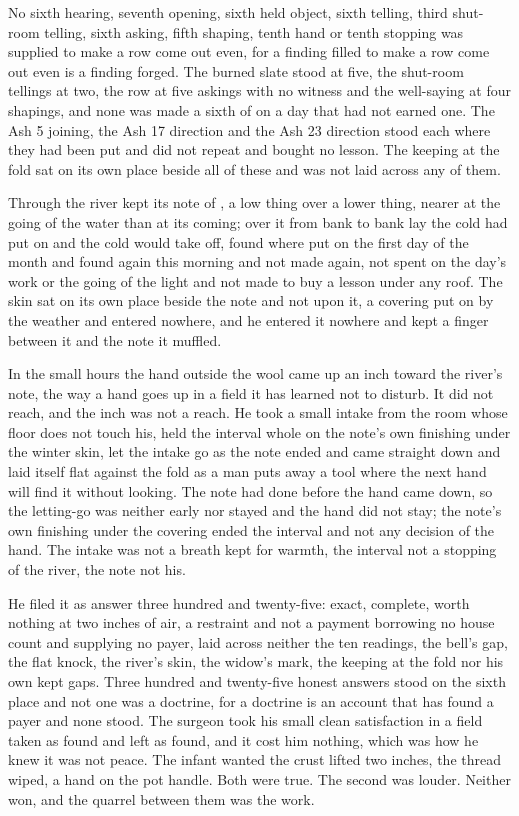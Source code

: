 No sixth hearing, seventh opening, sixth held object, sixth telling, third shut-room telling, sixth asking, fifth shaping, tenth hand or tenth stopping was supplied to make a row come out even, for a finding filled to make a row come out even is a finding forged. The burned slate stood at five, the shut-room tellings at two, the row at five askings with no witness and the well-saying at four shapings, and none was made a sixth of on a day that had not earned one. The Ash 5 joining, the Ash 17 direction and the Ash 23 direction stood each where they had been put and did not repeat and bought no lesson. The keeping at the fold sat on its own place beside all of these and was not laid across any of them.

Through  the river kept its note of , a low thing over a lower thing, nearer at the going of the water than at its coming; over it from bank to bank lay  the cold had put on and the cold would take off, found where put on the first day of the month and found again this morning and not made again, not spent on the day's work or the going of the light and not made to buy a lesson under any roof. The skin sat on its own place beside the note and not upon it, a covering put on by the weather and entered nowhere, and he entered it nowhere and kept a finger between it and the note it muffled.

In the small hours the hand outside the wool came up an inch toward the river's note, the way a hand goes up in a field it has learned not to disturb. It did not reach, and the inch was not a reach. He took a small intake from the room whose floor does not touch his, held the interval whole on the note's own finishing under the winter skin, let the intake go as the note ended and came straight down and laid itself flat against the fold as a man puts away a tool where the next hand will find it without looking. The note had done before the hand came down, so the letting-go was neither early nor stayed and the hand did not stay; the note's own finishing under the covering ended the interval and not any decision of the hand. The intake was not a breath kept for warmth, the interval not a stopping of the river, the note not his.

He filed it as answer three hundred and twenty-five: exact, complete, worth nothing at two inches of air, a restraint and not a payment borrowing no house count and supplying no payer, laid across neither the ten readings, the bell's gap, the flat knock, the river's skin, the widow's mark, the keeping at the fold nor his own kept gaps. Three hundred and twenty-five honest answers stood on the sixth place and not one was a doctrine, for a doctrine is an account that has found a payer and none stood. The surgeon took his small clean satisfaction in a field taken as found and left as found, and it cost him nothing, which was how he knew it was not peace. The infant wanted the crust lifted two inches, the thread wiped, a hand on the pot handle. Both were true. The second was louder. Neither won, and the quarrel between them was the work.


